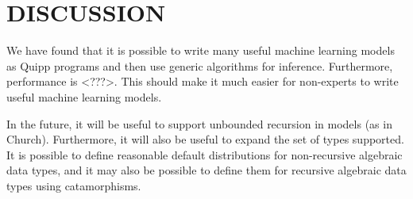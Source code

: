 \documentclass[proceed]{article}
\begin{document}
  \section{DISCUSSION}

  We have found that it is possible to write many useful machine learning models as Quipp programs and then use generic algorithms for inference.  Furthermore, performance is <???>.  This should make it much easier for non-experts to write useful machine learning models.
  
  In the future, it will be useful to support unbounded recursion in models (as in Church).  Furthermore, it will also be useful to expand the set of types supported.  It is possible to define reasonable default distributions for non-recursive algebraic data types, and it may also be possible to define them for recursive algebraic data types using catamorphisms.
\end{document}
